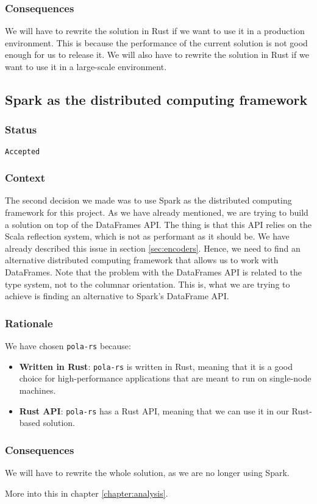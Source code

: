 \subsubsection{Consequences}

We will have to rewrite the solution in Rust if we want to use it in a production environment. This is because the performance of the current solution is not good enough for us to release it. We will also have to rewrite the solution in Rust if we want to use it in a large-scale environment.

\subsection{Spark as the distributed computing framework}

\subsubsection{Status}

\texttt{Accepted}

\subsubsection{Context}

The second decision we made was to use Spark as the distributed computing framework for this project. As we have already mentioned, we are trying to build a solution on top of the DataFrames API. The thing is that this API relies on the Scala reflection system, which is not as performant as it should be. We have already described this issue in section \ref{sec:encoders}. Hence, we need to find an alternative distributed computing framework that allows us to work with DataFrames. Note that the problem with the DataFrames API is related to the type system, not to the columnar orientation. This is, what we are trying to achieve is finding an alternative to Spark's DataFrame API.

\subsubsection{Rationale}

We have chosen \texttt{pola-rs} because:

\begin{itemize}
    \itemsep0.5em
    \item \textbf{Written in Rust}: \texttt{pola-rs} is written in Rust, meaning that it is a good choice for high-performance applications that are meant to run on single-node machines.
    \item \textbf{Rust API}: \texttt{pola-rs} has a Rust API, meaning that we can use it in our Rust-based solution.
\end{itemize}

\subsubsection{Consequences}

We will have to rewrite the whole solution, as we are no longer using Spark.

More into this in chapter \ref{chapter:analysis}.